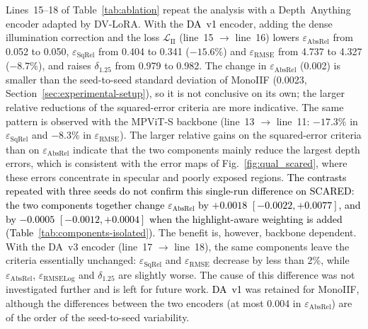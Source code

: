 \documentclass[a4paper,fleqn]{cas-dc}
\begin{document}
{{Lines~15--18 of Table~\ref{tab:ablation} repeat the analysis with a Depth~Anything encoder adapted by DV-LoRA. With the \textcolor{black}{DA~v1} encoder, adding the dense illumination correction and the loss $\mathcal{L}_\textrm{II}$ (line~15 $\rightarrow$ line~16) lowers $\varepsilon_\textrm{AbsRel}$ from 0.052 to 0.050, $\varepsilon_\textrm{SqRel}$ from 0.404 to 0.341 ($-15.6\%$) and $\varepsilon_\textrm{RMSE}$ from 4.737 to 4.327 ($-8.7\%$), and raises $\delta_{1.25}$ from 0.979 to 0.982. The change in $\varepsilon_\textrm{AbsRel}$ (0.002) is smaller than the seed-to-seed standard deviation of MonoIIF (0.0023, Section~\ref{sec:experimental-setup}), so it is not conclusive on its own; the larger relative reductions of the squared-error criteria are more indicative. The same pattern is observed with the MPViT-S backbone (line~13 $\rightarrow$ line~11: $-17.3\%$ in $\varepsilon_\textrm{SqRel}$ and $-8.3\%$ in $\varepsilon_\textrm{RMSE}$). The larger relative gains on the squared-error criteria than on $\varepsilon_\textrm{AbsRel}$ indicate that the two components mainly reduce the largest depth errors, which is consistent with the error maps of Fig.~\ref{fig:qual_scared}, where these errors concentrate in specular and poorly exposed regions. \textcolor{black}{The contrasts repeated with three seeds do not confirm this single-run difference on SCARED: the two components together change $\varepsilon_\textrm{AbsRel}$ by $+0.0018$ $[-0.0022, +0.0077]$, and by $-0.0005$ $[-0.0012, +0.0004]$ when the highlight-aware weighting is added (Table~\ref{tab:components-isolated}).}
The benefit is, however, backbone dependent. With the DA~v3 encoder (line~17 $\rightarrow$ line~18), the same components leave the criteria essentially unchanged: $\varepsilon_\textrm{SqRel}$ and $\varepsilon_\textrm{RMSE}$ decrease by less than 2\%, while $\varepsilon_\textrm{AbsRel}$, $\varepsilon_\textrm{RMSELog}$ and $\delta_{1.25}$ are slightly worse. The cause of this difference was not investigated further and is left for future work. \textcolor{black}{DA~v1} was retained for MonoIIF, although the differences between the two encoders (at most 0.004 in $\varepsilon_\textrm{AbsRel}$) are of the order of the seed-to-seed variability.}

}
\end{document}
